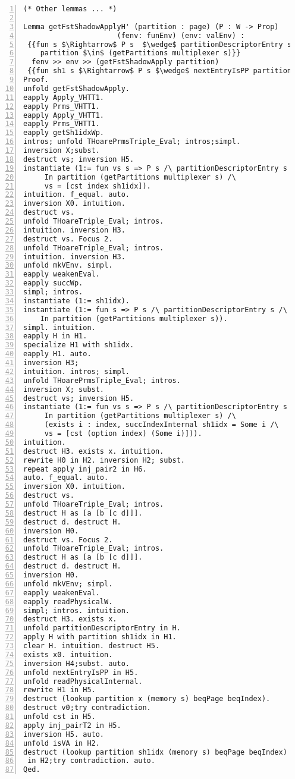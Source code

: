 \begin{appendices}
\begin{lstlisting}[xleftmargin=-.1\textwidth,
xrightmargin=-.1\textwidth,
mathescape=true,numbers=left]
(* Other lemmas ... *)

Lemma getFstShadowApplyH' (partition : page) (P : W -> Prop) 
	                  (fenv: funEnv) (env: valEnv) :
 {{fun s $\Rightarrow$ P s  $\wedge$ partitionDescriptorEntry s $\wedge$
 	partition $\in$ (getPartitions multiplexer s)}}
  fenv >> env >> (getFstShadowApply partition) 
 {{fun sh1 s $\Rightarrow$ P s $\wedge$ nextEntryIsPP partition sh1idx sh1 s}}.
Proof.
unfold getFstShadowApply.
eapply Apply_VHTT1.
eapply Prms_VHTT1.
eapply Apply_VHTT1.
eapply Prms_VHTT1.
eapply getSh1idxWp.
intros; unfold THoarePrmsTriple_Eval; intros;simpl.
inversion X;subst.
destruct vs; inversion H5.
instantiate (1:= fun vs s => P s /\ partitionDescriptorEntry s /\
     In partition (getPartitions multiplexer s) /\
     vs = [cst index sh1idx]).
intuition. f_equal. auto.
inversion X0. intuition.
destruct vs.
unfold THoareTriple_Eval; intros.
intuition. inversion H3.
destruct vs. Focus 2.
unfold THoareTriple_Eval; intros.
intuition. inversion H3.
unfold mkVEnv. simpl.
eapply weakenEval.
eapply succWp.
simpl; intros. 
instantiate (1:= sh1idx).
instantiate (1:= fun s => P s /\ partitionDescriptorEntry s /\
    In partition (getPartitions multiplexer s)).
simpl. intuition.
eapply H in H1.
specialize H1 with sh1idx.
eapply H1. auto.
inversion H3; 
intuition. intros; simpl.
unfold THoarePrmsTriple_Eval; intros.
inversion X; subst.
destruct vs; inversion H5.
instantiate (1:= fun vs s => P s /\ partitionDescriptorEntry s /\
     In partition (getPartitions multiplexer s) /\ 
     (exists i : index, succIndexInternal sh1idx = Some i /\ 
     vs = [cst (option index) (Some i)])).
intuition.
destruct H3. exists x. intuition.
rewrite H0 in H2. inversion H2; subst.
repeat apply inj_pair2 in H6.
auto. f_equal. auto.
inversion X0. intuition.
destruct vs.
unfold THoareTriple_Eval; intros.
destruct H as [a [b [c d]]].
destruct d. destruct H.
inversion H0.
destruct vs. Focus 2.
unfold THoareTriple_Eval; intros.
destruct H as [a [b [c d]]].
destruct d. destruct H.
inversion H0.
unfold mkVEnv; simpl.
eapply weakenEval.
eapply readPhysicalW.
simpl; intros. intuition.
destruct H3. exists x.
unfold partitionDescriptorEntry in H.
apply H with partition sh1idx in H1.
clear H. intuition. destruct H5.
exists x0. intuition.
inversion H4;subst. auto.
unfold nextEntryIsPP in H5.
unfold readPhysicalInternal.
rewrite H1 in H5.
destruct (lookup partition x (memory s) beqPage beqIndex).
destruct v0;try contradiction.
unfold cst in H5.
apply inj_pairT2 in H5.
inversion H5. auto.
unfold isVA in H2.
destruct (lookup partition sh1idx (memory s) beqPage beqIndex) 
 in H2;try contradiction. auto.
Qed.
\end{lstlisting} \pagebreak


\end{appendices}
